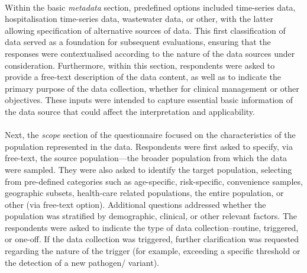 \documentclass{article}
\begin{document}
\paragraph{}Within the basic \textit{metadata} section, predefined options included time-series data, hospitalisation time-series data, wastewater data, or other, with the latter allowing specification of alternative sources of data. This first classification of data served as a foundation for subsequent evaluations, ensuring that the responses were contextualised according to the nature of the data sources under consideration. Furthermore, within this section, respondents were asked to provide a free-text description of the data content, as well as to indicate the primary purpose of the data collection, whether for clinical management or other objectives. These inputs were intended to capture essential basic information of the data source that could affect the interpretation and applicability. 

\paragraph{}Next, the \textit{scope} section of the questionnaire focused on the characteristics of the population represented in the data. Respondents were first asked to specify, via free-text, the source population---the broader population from which the data were sampled. They were also asked to identify the target population, selecting from pre-defined categories such as age-specific, risk-specific, convenience samples, geographic subsets, health-care related populations, the entire population, or other (via free-text option). Additional questions addressed whether the population was stratified by demographic, clinical, or other relevant factors. The respondents were asked to indicate the type of data collection--routine, triggered, or one-off. If the data collection was triggered, further clarification was requested regarding the nature of the trigger (for example, exceeding a specific threshold or the detection of a new pathogen/ variant). 
\end{document}
